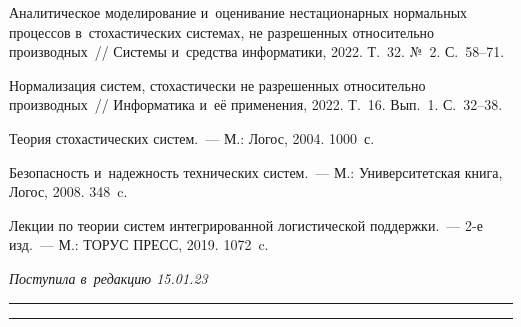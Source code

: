 \begin{multicols}{2}
{{\begin{thebibliography}{99}
Аналитическое моделирование и~оценивание нестационарных нормальных процессов 
в~стохастических сис\-те\-мах, не разрешенных относительно производных~// 
Сис\-те\-мы и~средства информатики, 2022. Т.~32. №~2. С.~58--71.


Нормализация сис\-тем, стохастически не разрешенных относительно производных~// 
Информатика и~её применения, 2022. Т.~16. Вып.~1. С.~32--38.


Теория стохастических сис\-тем.~--- М.: Логос, 2004. 1000~с.

\pagebreak


Безопасность и~надежность технических сис\-тем.~--- М.: Университетская книга, Логос, 2008. 348~c.

Лекции по теории сис\-тем интегрированной логистической поддержки.~--- 2-е изд.~--- М.: ТОРУС ПРЕСС, 2019. 1072~c.
\end{thebibliography}

 }
 }

\end{multicols}

\vspace*{-6pt}

\hfill{\small\textit{Поступила в~редакцию 15.01.23}}

\vspace*{8pt}




\hrule

\vspace*{2pt}

\hrule


\def\tit{ANALYTICAL MODELING OF DISTRIBUTIONS WITH~INVARIANT~MEASURE IN~STOCHASTIC SYSTEMS WITH~UNSOLVED~DERIVATIVES}


\def\titkol{Analytical modeling of distributions with invariant measure in stochastic systems with unsolved derivatives}


\def\aut{I.\,N.~Sinitsyn$^{1,2}$}

\def\autkol{I.\,N.~Sinitsyn}

